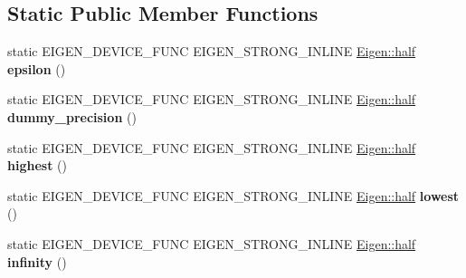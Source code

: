 \subsection*{Static Public Member Functions}
\begin{DoxyCompactItemize}
\item 
\mbox{\label{struct_eigen_1_1_num_traits_3_01_eigen_1_1half_01_4_a6fffdc81a58bd3906030d469505ef63d}} 
static E\+I\+G\+E\+N\+\_\+\+D\+E\+V\+I\+C\+E\+\_\+\+F\+U\+NC E\+I\+G\+E\+N\+\_\+\+S\+T\+R\+O\+N\+G\+\_\+\+I\+N\+L\+I\+NE \hyperlink{struct_eigen_1_1half}{Eigen\+::half} {\bfseries epsilon} ()
\item 
\mbox{\label{struct_eigen_1_1_num_traits_3_01_eigen_1_1half_01_4_a09a018ebeae611c150313c8cda0f145a}} 
static E\+I\+G\+E\+N\+\_\+\+D\+E\+V\+I\+C\+E\+\_\+\+F\+U\+NC E\+I\+G\+E\+N\+\_\+\+S\+T\+R\+O\+N\+G\+\_\+\+I\+N\+L\+I\+NE \hyperlink{struct_eigen_1_1half}{Eigen\+::half} {\bfseries dummy\+\_\+precision} ()
\item 
\mbox{\label{struct_eigen_1_1_num_traits_3_01_eigen_1_1half_01_4_a67bf27437a43b8675e40045309539f98}} 
static E\+I\+G\+E\+N\+\_\+\+D\+E\+V\+I\+C\+E\+\_\+\+F\+U\+NC E\+I\+G\+E\+N\+\_\+\+S\+T\+R\+O\+N\+G\+\_\+\+I\+N\+L\+I\+NE \hyperlink{struct_eigen_1_1half}{Eigen\+::half} {\bfseries highest} ()
\item 
\mbox{\label{struct_eigen_1_1_num_traits_3_01_eigen_1_1half_01_4_a7d5f67182bb2516ea3efc7066295513b}} 
static E\+I\+G\+E\+N\+\_\+\+D\+E\+V\+I\+C\+E\+\_\+\+F\+U\+NC E\+I\+G\+E\+N\+\_\+\+S\+T\+R\+O\+N\+G\+\_\+\+I\+N\+L\+I\+NE \hyperlink{struct_eigen_1_1half}{Eigen\+::half} {\bfseries lowest} ()
\item 
\mbox{\label{struct_eigen_1_1_num_traits_3_01_eigen_1_1half_01_4_ac4e7248fc3f54219a3c5b07cedf4d518}} 
static E\+I\+G\+E\+N\+\_\+\+D\+E\+V\+I\+C\+E\+\_\+\+F\+U\+NC E\+I\+G\+E\+N\+\_\+\+S\+T\+R\+O\+N\+G\+\_\+\+I\+N\+L\+I\+NE \hyperlink{struct_eigen_1_1half}{Eigen\+::half} {\bfseries infinity} ()
\item 
\mbox{\label{struct_eigen_1_1_num_traits_3_01_eigen_1_1half_01_4_a0b8075845399063d92caa9e746eaf2e9}} 

\end{DoxyCompactItemize}
